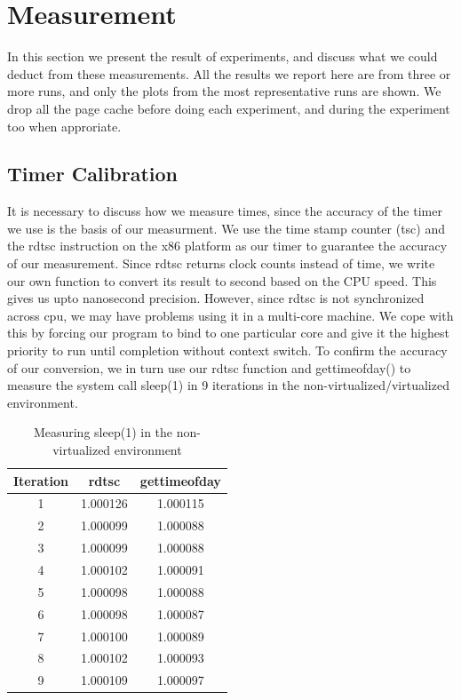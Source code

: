 \section{Measurement}
\label{section:measurement}

In this section we present the result of experiments, and discuss what we could deduct from these measurements. All the results we report here are from three or more runs, and only the plots from the most representative runs are shown. We drop all the page cache before doing each experiment, and during the experiment too when approriate.

\subsection{Timer Calibration}
It is necessary to discuss how we measure times, since the accuracy of the timer we use is the basis of our measurment. We use the time stamp counter (tsc) and the rdtsc instruction on the x86 platform as our timer to guarantee the accuracy of our measurement. Since rdtsc returns clock counts instead of time, we write our own function to convert its result to second based on the CPU speed. This gives us upto nanosecond precision. However, since rdtsc is not synchronized across cpu, we may have problems using it in a multi-core machine. We cope with this by forcing our program to bind to one particular core and give it the highest priority to run until completion without context switch. To confirm the accuracy of our conversion, we in turn use our rdtsc function and gettimeofday() to measure the system call sleep(1) in 9 iterations in the non-virtualized/virtualized environment. 

\begin{table}[!thb]
\centering
\begin{tabular}{|c|c|c|} \hline
Iteration & rdtsc & gettimeofday \\ \hline
1 & 1.000126 & 1.000115 \\ \hline
2 & 1.000099 & 1.000088 \\ \hline
3 & 1.000099 & 1.000088 \\ \hline
4 & 1.000102 & 1.000091 \\ \hline
5 & 1.000098 & 1.000088 \\ \hline
6 & 1.000098 & 1.000087 \\ \hline
7 & 1.000100 & 1.000089 \\ \hline
8 & 1.000102 & 1.000093 \\ \hline
9 & 1.000109 & 1.000097 \\ \hline
\end{tabular}\label{tab:cali_non_virtual}
\caption{Measuring sleep(1) in the non-virtualized environment}
\end{table}


